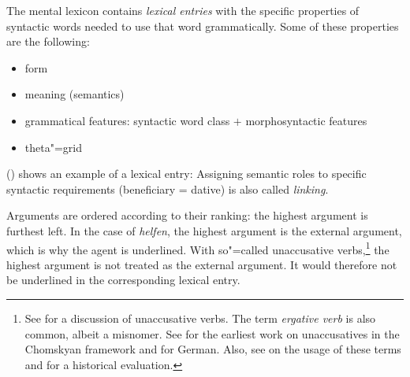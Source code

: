 The mental lexicon contains \emph{lexical entries} with the specific properties of syntactic words needed to use that word grammatically.
Some of these properties are the following:
\begin{itemize}
\item form
\item meaning (semantics)
\item grammatical features: syntactic word class $+$ morphosyntactic features   
\item theta"=grid
\end{itemize}

\noindent
() shows an example of a lexical entry:
\ea
{}
\z
Assigning semantic roles to specific syntactic requirements (beneficiary = dative) is also called \emph{linking}.

Arguments are ordered according to their ranking: the highest argument is furthest left. In the case
of \emph{helfen}, the highest argument is the external argument, which is why the agent is underlined. With so"=called unaccusative verbs,\footnote{%
See  for a discussion of unaccusative verbs. The term \emph{ergative verb} is also common, albeit
a misnomer. See  for the earliest work on unaccusatives in the Chomskyan framework and 
 for German. Also, see  on the usage of these terms and for a historical evaluation.
}
the highest argument is not treated as the external argument. It would therefore not be underlined in the corresponding lexical entry.

